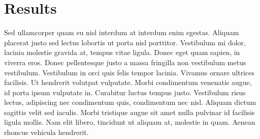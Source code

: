 \begin{figure}[ht]
  \label{fig:unfolded_dilep_dist_stress_test_2}
\end{figure}
\FloatBarrier





\section{Results}

Sed ullamcorper quam eu nisl interdum at interdum enim egestas. Aliquam placerat justo sed lectus lobortis ut porta nisl porttitor. Vestibulum mi dolor, lacinia molestie gravida at, tempus vitae ligula. Donec eget quam sapien, in viverra eros. Donec pellentesque justo a massa fringilla non vestibulum metus vestibulum. Vestibulum in orci quis felis tempor lacinia. Vivamus ornare ultrices facilisis. Ut hendrerit volutpat vulputate. Morbi condimentum venenatis augue, id porta ipsum vulputate in. Curabitur luctus tempus justo. Vestibulum risus lectus, adipiscing nec condimentum quis, condimentum nec nisl. Aliquam dictum sagittis velit sed iaculis. Morbi tristique augue sit amet nulla pulvinar id facilisis ligula mollis. Nam elit libero, tincidunt ut aliquam at, molestie in quam. Aenean rhoncus vehicula hendrerit.



